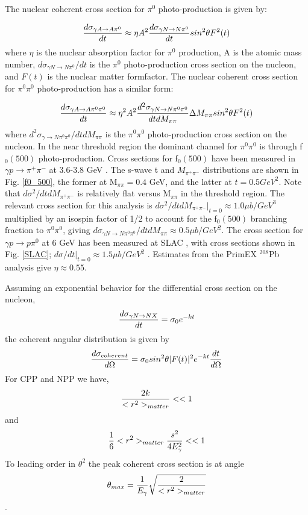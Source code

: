 The nuclear coherent cross section for  $\pi^0$ photo-production is given by: 

$$ {d\sigma_{\gamma A \rightarrow A  \pi^0 } \over dt } \approx \eta A^2 { d\sigma_{\gamma N \rightarrow N \pi^0 } \over dt }sin^2 \theta F^2(t) $$
where $\eta$ is the nuclear absorption factor for $\pi^0$ production, A is the atomic mass number, $d\sigma_{\gamma N \rightarrow N\pi^0 } / dt$ is the $\pi^0$ photo-production cross section on the nucleon, and $F(t)$ is the nuclear matter formfactor.  The nuclear coherent cross section for  $\pi^0 \pi^0$ photo-production has a similar form: 

$$ {d\sigma_{\gamma A \rightarrow A  \pi^0 \pi^0} \over dt } \approx  \eta^2 A^2 { d^2 \sigma_{\gamma N \rightarrow N \pi^0 \pi^0} \over dt dM_{\pi \pi}}\Delta M_{\pi \pi} sin^2 \theta F^2(t) $$
where $d^2\sigma_{\gamma \rightarrow N\pi^0 \pi^0} / dt dM_{\pi \pi}$ is the $\pi^0 \pi^0$ photo-production cross section on the nucleon.
  In the near threshold region the dominant channel for $\pi^0 \pi^0$ is through f$_0(500)$ photo-production.    Cross sections for f$_0(500)$   have been measured in 
  $\gamma p \rightarrow \pi^+ \pi^-$ at 3.6-3.8 GeV \cite{Battaglieri:2009aa}.   The s-wave t and $M_{\pi^+ \pi^-}$ distributions are shown in Fig. \ref{f0_500}, the former at M$_{\pi \pi}=0.4$ GeV, and the latter at $t=0.5 GeV^2$.  Note that  
  $d\sigma^2 / dt dM_{\pi^+ \pi^-}$ is relatively flat versus M$_{\pi \pi}$ in the threshold region. The relevant cross section for this analysis is $d\sigma^2 / dt dM_{\pi^+ \pi^-}|_{ t = 0} \approx 1.0 \mu b/GeV^3$  multiplied by an isospin factor of 1/2 to account for the f$_0(500)$ branching fraction to $\pi^0 \pi^0$, giving $d \sigma_{\gamma N \rightarrow N \pi^0 \pi^0} / dt dM_{\pi \pi} \approx 0.5 \mu b / GeV^2 $. The cross section for  $\gamma p \rightarrow  p \pi^0$ at 6 GeV has been measured at SLAC \cite{Anderson:1971}, with cross sections shown in Fig. \ref{SLAC};   $d\sigma / dt|_{t=0} \approx 1.5 \mu b/GeV^2$ .   Estimates from the PrimEX $^{208}$Pb analysis give $\eta \approx 0.55$.  
  
  Assuming an exponential behavior for the differential cross section on the nucleon, 
  $$ {d\sigma_{\gamma N \rightarrow N X} \over dt} = \sigma_0 e^{-kt}$$
  the coherent angular distribution is given by
  $$ { d\sigma_{coherent} \over d\Omega} = \sigma_0 sin^2 \theta |F(t)|^2 e^{-kt} {dt \over d\Omega}$$ 
  For CPP and NPP we have, 
  $$ {2k \over <r^2>_{matter}}<<1 $$
  and 
  $${1 \over 6}<r^2>_{matter} {s^2 \over 4E^2_\gamma}<<1$$
   To leading order in $\theta^2$ the peak coherent cross section is at angle 
$$ \theta_{max}={1 \over E_\gamma}\sqrt{ 2 
 \over <r^2>_{matter} } $$
 . 
 
